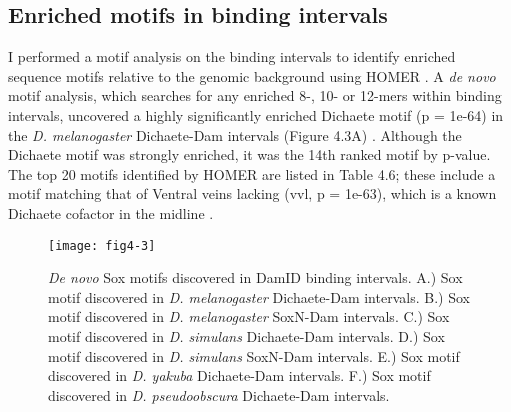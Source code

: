 \subsection{Enriched motifs in binding intervals}
I performed a motif analysis on the binding intervals to identify enriched sequence motifs relative to the genomic background using HOMER \citep{heinz_simple_2010}. A \emph{de novo} motif analysis, which searches for any enriched 8-, 10- or 12-mers within binding intervals, uncovered a highly significantly enriched Dichaete motif (p = 1e-64) in the \emph{D. melanogaster} Dichaete-Dam intervals (Figure 4.3A) \citep{aleksic_role_2013}. Although the Dichaete motif was strongly enriched, it was the 14th ranked motif by p-value. The top 20 motifs identified by HOMER are listed in Table 4.6; these include a motif matching that of Ventral veins lacking (vvl, p = 1e-63), which is a known Dichaete cofactor in the midline \citep{aleksic_role_2013,soriano_drosophila_1998}.

\begin{figure}[ht]
	\centering
	\texttt{[image: fig4-3]}
	\caption[\emph{De novo} Sox motifs discovered in DamID binding intervals]{\emph{De novo} Sox motifs discovered in DamID binding intervals. A.) Sox motif discovered in \emph{D. melanogaster} Dichaete-Dam intervals. B.) Sox motif discovered in \emph{D. melanogaster} SoxN-Dam intervals. C.) Sox motif discovered in \emph{D. simulans} Dichaete-Dam intervals. D.) Sox motif discovered in \emph{D. simulans} SoxN-Dam intervals. E.) Sox motif discovered in \emph{D. yakuba} Dichaete-Dam intervals. F.) Sox motif discovered in \emph{D. pseudoobscura} Dichaete-Dam intervals.}
	\label{Figure 4.3}
\end{figure}

